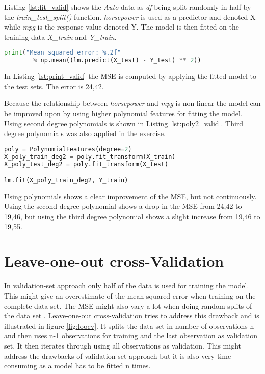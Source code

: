 Listing \ref{lst:fit_valid} shows the \emph{Auto} data as \emph{df} being split randomly in half by the \emph{train\_test\_split()} function. 
\emph{horsepower} is used as a predictor and denoted X while \emph{mpg} is the response value denoted Y. The model is then fitted on the training data \emph{X\_train} and \emph{Y\_train}.

\begin{lstlisting}[language=Python, label=lst:print_valid, caption=Printing MSE]
print("Mean squared error: %.2f" 
		% np.mean((lm.predict(X_test) - Y_test) ** 2))
\end{lstlisting}

In Listing \ref{lst:print_valid} the MSE is computed by applying the fitted model to the test sets. The error is 24,42. 

Because the relationship between \emph{horsepower} and \emph{mpg} is non-linear the model can be improved upon by using higher polynomial features for fitting the model. Using second degree polynomials is shown in Listing \ref{lst:poly2_valid}. Third degree polynomials was also applied in the exercise.

\begin{lstlisting}[language=Python, label=lst:poly2_valid, caption=Polynomial features with degree = 2]
poly = PolynomialFeatures(degree=2)
X_poly_train_deg2 = poly.fit_transform(X_train)
X_poly_test_deg2 = poly.fit_transform(X_test)

lm.fit(X_poly_train_deg2, Y_train)
\end{lstlisting}

Using polynomials shows a clear improvement of the MSE, but not continuously. Using the second degree polynomial shows a drop in the MSE from 24,42 to 19,46, but using the third degree polynomial shows a slight increase from 19,46 to 19,55. 

\section{Leave-one-out cross-Validation}
In validation-set approach only half of the data is used for training the model. This might give an overestimate of the mean squared error when training on the complete data set. The MSE might also vary a lot when doing random splits of the  data set  \citep[pp. 54]{AIbook}. Leave-one-out cross-validation tries to address this drawback and is illustrated in figure \ref{fig:loocv}. It splits the  data set in number of observations n and then uses n-1 observations for training and the last observation as validation set. It then iterates through using all observations as validation. This might address the drawbacks of validation set approach but it is also very time consuming as a model has to be fitted n times.

